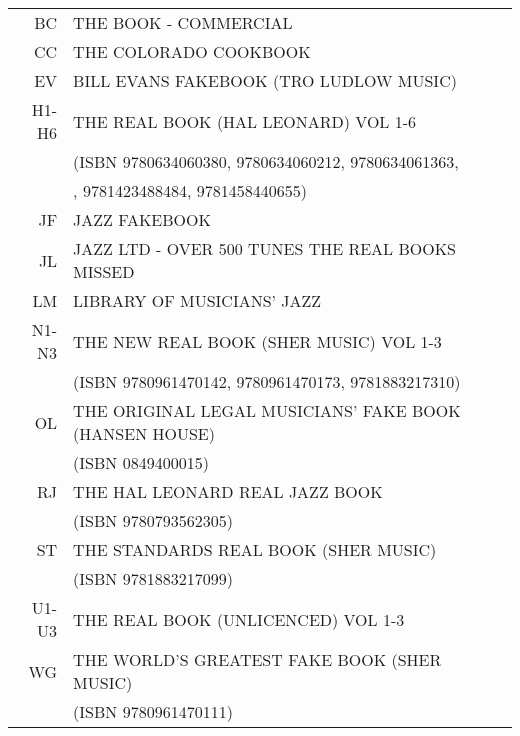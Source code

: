 \documentclass[8pt]{scrartcl}
\begin{document}
\selectfont
\begin{center}
  \begin{tabular}{rl}%
    BC    &  THE BOOK - COMMERCIAL\\
    CC    &  THE COLORADO COOKBOOK\\
    EV    &  BILL EVANS FAKEBOOK (TRO LUDLOW MUSIC)\\
    H1-H6 &  THE REAL BOOK (HAL LEONARD) VOL 1-6\\
          &  \quad(ISBN 9780634060380, 9780634060212, 9780634061363, \\
          &  \quad9781423425427, 9781423488484, 9781458440655) \\
    JF    &  JAZZ FAKEBOOK\\
    JL    &  JAZZ LTD - OVER 500 TUNES THE REAL BOOKS MISSED\\
    LM    &  LIBRARY OF MUSICIANS’ JAZZ\\
    N1-N3 &  THE NEW REAL BOOK (SHER MUSIC) VOL 1-3\\
          &  \quad(ISBN 9780961470142, 9780961470173, 9781883217310)\\
    OL    & THE ORIGINAL LEGAL MUSICIANS' FAKE BOOK (HANSEN HOUSE)\\
          &  \quad(ISBN 0849400015)\\
    RJ    &  THE HAL LEONARD REAL JAZZ BOOK\\
          &  \quad(ISBN 9780793562305)\\
    ST    &  THE STANDARDS REAL BOOK (SHER MUSIC)\\
          &  \quad(ISBN 9781883217099)\\
    U1-U3 &  THE REAL BOOK (UNLICENCED) VOL 1-3\\
    WG    &  THE WORLD'S GREATEST FAKE BOOK (SHER MUSIC)\\
          &  \quad(ISBN 9780961470111)\\
  \end{tabular}
\end{center}

\begin{multicols}{3}
  \raggedright
  
\end{multicols}
\end{document}

